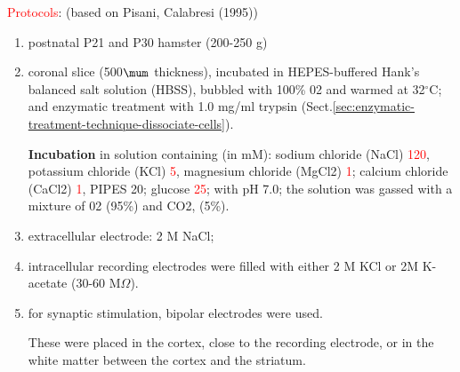 \textcolor{red}{Protocols}: (based on Pisani, Calabresi (1995))
\begin{enumerate}
  \item postnatal P21 and P30 hamster (200-250 g)
  
  \item coronal slice (500$\mum$ thickness), incubated in 
  HEPES-buffered Hank's balanced salt solution (HBSS), bubbled with 100\% 02 and
  warmed at 32$^\circ$C; and enzymatic treatment with 1.0 mg/ml trypsin
  (Sect.\ref{sec:enzymatic-treatment-technique-dissociate-cells}).
  
{\bf Incubation} in solution containing (in mM): sodium chloride (NaCl)
\textcolor{red}{120}, potassium chloride (KCl) \textcolor{red}{5}, magnesium
chloride (MgCl2) \textcolor{red}{1}; calcium chloride (CaCl2)
\textcolor{red}{1}, PIPES 20; glucose \textcolor{red}{25}; with pH 7.0; the
solution was gassed with a mixture of 02 (95\%) and CO2, (5\%).

  
   \item extracellular electrode: 2 M NaCl; 
   
   \item intracellular recording electrodes were filled with either 2 M KCl or 
   2M K-acetate (30-60 M$\Omega$).
   
   \item for synaptic stimulation, bipolar electrodes were used.
   
 These were placed in the cortex, close to the recording electrode, or in the
 white matter between the cortex and the striatum.
  
\end{enumerate}
